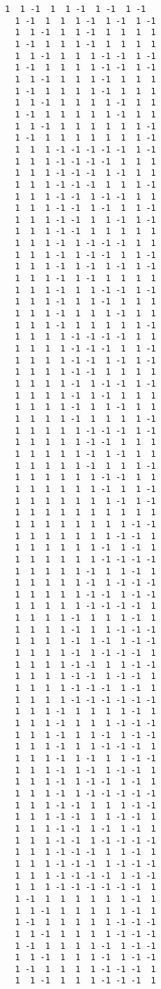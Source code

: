 \documentclass[%
  twocolumn,
 showpacs,
 showkeys,
 preprintnumbers,
 amsmath,amssymb,
 aps,
  pra,
  longbibliography,
 floatfix,
 ]{revtex4-1}
\begin{document}
{\begin{lstlisting}[backgroundcolor=\color{yellow!10},framerule=0pt,breaklines=true, frame=tb]
  1  1 -1  1  1 -1  1 -1  1 -1
  1 -1  1  1  1 -1  1 -1  1 -1
  1  1 -1  1  1 -1  1  1  1  1
  1 -1  1  1  1 -1  1  1  1  1
  1  1 -1  1  1  1 -1 -1  1 -1
  1 -1  1  1  1  1 -1 -1  1 -1
  1  1 -1  1  1  1 -1  1  1  1
  1 -1  1  1  1  1 -1  1  1  1
  1  1 -1  1  1  1  1 -1  1  1
  1 -1  1  1  1  1  1 -1  1  1
  1  1 -1  1  1  1  1  1  1 -1
  1 -1  1  1  1  1  1  1  1 -1
  1  1  1 -1 -1 -1 -1 -1  1 -1
  1  1  1 -1 -1 -1 -1  1  1  1
  1  1  1 -1 -1 -1  1 -1  1  1
  1  1  1 -1 -1 -1  1  1  1 -1
  1  1  1 -1 -1  1 -1 -1  1  1
  1  1  1 -1 -1  1 -1  1  1 -1
  1  1  1 -1 -1  1  1 -1  1 -1
  1  1  1 -1 -1  1  1  1  1  1
  1  1  1 -1  1 -1 -1 -1  1  1
  1  1  1 -1  1 -1 -1  1  1 -1
  1  1  1 -1  1 -1  1 -1  1 -1
  1  1  1 -1  1 -1  1  1  1  1
  1  1  1 -1  1  1 -1 -1  1 -1
  1  1  1 -1  1  1 -1  1  1  1
  1  1  1 -1  1  1  1 -1  1  1
  1  1  1 -1  1  1  1  1  1 -1
  1  1  1  1 -1 -1 -1 -1  1  1
  1  1  1  1 -1 -1 -1  1  1 -1
  1  1  1  1 -1 -1  1 -1  1 -1
  1  1  1  1 -1 -1  1  1  1  1
  1  1  1  1 -1  1 -1 -1  1 -1
  1  1  1  1 -1  1 -1  1  1  1
  1  1  1  1 -1  1  1 -1  1  1
  1  1  1  1 -1  1  1  1  1 -1
  1  1  1  1  1 -1 -1 -1  1 -1
  1  1  1  1  1 -1 -1  1  1  1
  1  1  1  1  1 -1  1 -1  1  1
  1  1  1  1  1 -1  1  1  1 -1
  1  1  1  1  1  1 -1 -1  1  1
  1  1  1  1  1  1 -1  1  1 -1
  1  1  1  1  1  1  1 -1  1 -1
  1  1  1  1  1  1  1  1  1  1
  1  1  1  1  1  1  1  1 -1 -1
  1  1  1  1  1  1  1 -1 -1  1
  1  1  1  1  1  1 -1  1 -1  1
  1  1  1  1  1  1 -1 -1 -1 -1
  1  1  1  1  1 -1  1  1 -1  1
  1  1  1  1  1 -1  1 -1 -1 -1
  1  1  1  1  1 -1 -1  1 -1 -1
  1  1  1  1  1 -1 -1 -1 -1  1
  1  1  1  1 -1  1  1  1 -1  1
  1  1  1  1 -1  1  1 -1 -1 -1
  1  1  1  1 -1  1 -1  1 -1 -1
  1  1  1  1 -1  1 -1 -1 -1  1
  1  1  1  1 -1 -1  1  1 -1 -1
  1  1  1  1 -1 -1  1 -1 -1  1
  1  1  1  1 -1 -1 -1  1 -1  1
  1  1  1  1 -1 -1 -1 -1 -1 -1
  1  1  1 -1  1  1  1  1 -1  1
  1  1  1 -1  1  1  1 -1 -1 -1
  1  1  1 -1  1  1 -1  1 -1 -1
  1  1  1 -1  1  1 -1 -1 -1  1
  1  1  1 -1  1 -1  1  1 -1 -1
  1  1  1 -1  1 -1  1 -1 -1  1
  1  1  1 -1  1 -1 -1  1 -1  1
  1  1  1 -1  1 -1 -1 -1 -1 -1
  1  1  1 -1 -1  1  1  1 -1 -1
  1  1  1 -1 -1  1  1 -1 -1  1
  1  1  1 -1 -1  1 -1  1 -1  1
  1  1  1 -1 -1  1 -1 -1 -1 -1
  1  1  1 -1 -1 -1  1  1 -1  1
  1  1  1 -1 -1 -1  1 -1 -1 -1
  1  1  1 -1 -1 -1 -1  1 -1 -1
  1  1  1 -1 -1 -1 -1 -1 -1  1
  1 -1  1  1  1  1  1  1 -1  1
  1  1 -1  1  1  1  1  1 -1  1
  1 -1  1  1  1  1  1 -1 -1 -1
  1  1 -1  1  1  1  1 -1 -1 -1
  1 -1  1  1  1  1 -1  1 -1 -1
  1  1 -1  1  1  1 -1  1 -1 -1
  1 -1  1  1  1  1 -1 -1 -1  1
  1  1 -1  1  1  1 -1 -1 -1  1

\end{lstlisting}}
\end{document}
